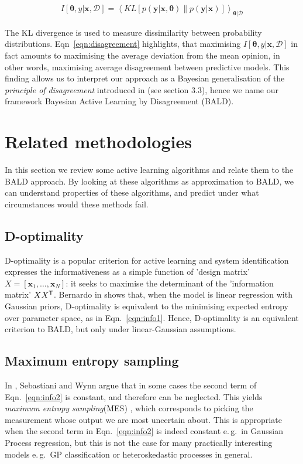 \documentclass[twoside]{article}
\newcommand{\transpose}[1]{#1^{\mbox{\sf \scriptsize T}}}
\newcommand{\param}{\bm{\theta}}
\newcommand{\x}{\bm{x}}
\newcommand{\y}{\bm{y}}
\newcommand{\data}{\mathcal{D}}
\newcommand{\eg}{e.\,g.\ }
\begin{document}
\begin{align}
I[\param,y\vert\x,\data] = \left\langle KL\left[ p(\y\vert\x,\param) \middle\| p(\y\vert\x) \right] \right\rangle_{\param\vert\data}\label{eqn:disagreement}
\end{align}

The KL divergence is used to measure dissimilarity between probability distributions. Eqn\ \eqref{eqn:disagreement} highlights, that maximising $I[\param,y\vert\x,\data]$ in fact amounts to maximising the average deviation from the mean opinion, in other words, maximising average disagreement between predictive models. This finding allows us to interpret our approach as a Bayesian generalisation of the \emph{principle of disagreement} introduced in \cite{Seung1992} (see section 3.3), hence we name our framework Bayesian Active Learning by Disagreement (BALD).

\section{Related methodologies}

In this section we review some active learning algorithms and relate them to the BALD approach. By looking at these algorithms as approximation to BALD, we can understand properties of these algorithms, and predict under what circumstances would these methods fail.

\subsection{D-optimality}

D-optimality  \cite{st1975d} is a popular criterion for active learning and system identification expresses the informativeness as a simple function of 'design matrix' $X=[\x_1,\ldots,\x_N]$: it seeks to maximise the determinant of the 'information matrix' $X\transpose{X}$. Bernardo in \cite{Bernardo1979} shows that, when the model is linear regression with Gaussian priors, D-optimality is equivalent to the minimising expected entropy over parameter space, as in Eqn.\  \eqref{eqn:info1}. Hence, D-optimality is an equivalent criterion to BALD, but only under linear-Gaussian assumptions.

\subsection{Maximum entropy sampling}

In \cite{sebastiani2000maximum}, Sebastiani and Wynn argue that in some cases the second term of Eqn.\  \eqref{eqn:info2}  is constant, and therefore can be neglected. This yields \emph{maximum entropy sampling}(MES) \cite{shewry1987maximum, sebastiani2000maximum}, which corresponds to picking the measurement whose output we are most uncertain about. This is appropriate when the second term in Eqn.\  \eqref{eqn:info2} is indeed constant \eg in Gaussian Process regression, but this is not the case for many practically interesting models \eg GP classification or heteroskedastic processes in general.
\end{document}
